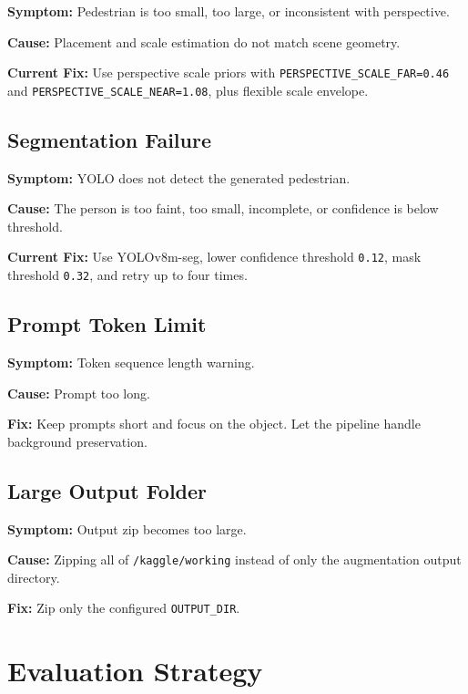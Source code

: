\documentclass[12pt,a4paper]{article}
\begin{document}
\textbf{Symptom:} Pedestrian is too small, too large, or inconsistent with
perspective.

\textbf{Cause:} Placement and scale estimation do not match scene geometry.

\textbf{Current Fix:} Use perspective scale priors with
\texttt{PERSPECTIVE\_SCALE\_FAR=0.46} and
\texttt{PERSPECTIVE\_SCALE\_NEAR=1.08}, plus flexible scale envelope.

\subsection{Segmentation Failure}

\textbf{Symptom:} YOLO does not detect the generated pedestrian.

\textbf{Cause:} The person is too faint, too small, incomplete, or confidence is
below threshold.

\textbf{Current Fix:} Use YOLOv8m-seg, lower confidence threshold
\texttt{0.12}, mask threshold \texttt{0.32}, and retry up to four times.

\subsection{Prompt Token Limit}

\textbf{Symptom:} Token sequence length warning.

\textbf{Cause:} Prompt too long.

\textbf{Fix:} Keep prompts short and focus on the object. Let the pipeline
handle background preservation.

\subsection{Large Output Folder}

\textbf{Symptom:} Output zip becomes too large.

\textbf{Cause:} Zipping all of \texttt{/kaggle/working} instead of only the
augmentation output directory.

\textbf{Fix:} Zip only the configured \texttt{OUTPUT\_DIR}.

\section{Evaluation Strategy}
\end{document}
